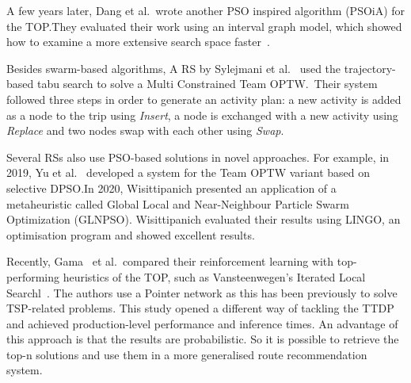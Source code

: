 A few years later, Dang et al.\ wrote another PSO inspired algorithm (PSOiA) for
the TOP.\@ They evaluated their work using an interval graph model, which showed
how to examine a more extensive search space faster~\cite{Gunawan2016}.

Besides swarm-based algorithms, A RS by Sylejmani et al.~\cite{Sylejmani2012}
used the trajectory-based tabu search to solve a Multi Constrained Team OPTW.\
Their system followed three steps in order to generate an activity plan: a new
activity is added as a node to the trip using \emph{Insert}, a node is
exchanged with a new activity using \emph{Replace} and two nodes swap with each
other using \emph{Swap}. 

Several RSs also use PSO-based solutions in novel approaches. For example, in
2019, Yu et al.~\cite{Yu2019} developed a system for the Team OPTW variant based on
selective DPSO.\@ In 2020, Wisittipanich\cite{Wisittipanich2020} presented an application of a
metaheuristic called Global Local and Near-Neighbour Particle Swarm
Optimization (GLNPSO). Wisittipanich evaluated their results using LINGO, an
optimisation program and showed excellent results.

Recently, Gama~\cite{Gama2020}  et al.\ compared their reinforcement learning with
top-performing heuristics of the TOP, such as Vansteenwegen's Iterated Local
Searchl~\cite{Vansteenwegen2009}. The authors use a Pointer network as this has been
previously to solve TSP-related problems. This study opened a different way of
tackling the TTDP and achieved production-level performance and inference
times. An advantage of this approach is that the results are probabilistic. So
it is possible to retrieve the top-n solutions and use them in a more
generalised route recommendation system.

